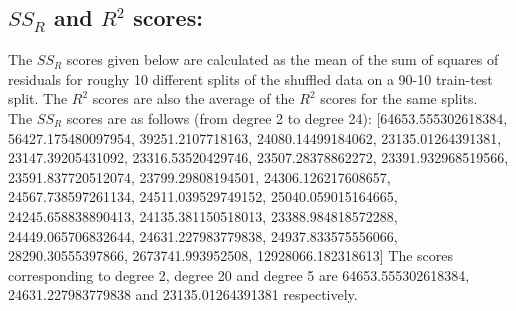 \subsection{$SS_R$ and $R^2$ scores: }
The $SS_R$ scores given below are calculated as the mean of the sum of squares of residuals for roughy 10 different splits of the shuffled data on a 90-10 train-test split. The $R^2$ scores are also the average of the $R^2$ scores for the same splits.\\
The $SS_R$ scores are as follows (from degree 2 to degree 24):
[64653.555302618384, 56427.175480097954, 39251.2107718163, 24080.14499184062, 23135.01264391381, 23147.39205431092, 23316.53520429746, 23507.28378862272, 23391.932968519566, 23591.837720512074, 23799.29808194501, 24306.126217608657, 24567.738597261134, 24511.039529749152, 25040.059015164665, 24245.658838890413, 24135.381150518013, 23388.984818572288, 24449.065706832644, 24631.227983779838, 24937.833575556066, 28290.30555397866, 2673741.993952508, 12928066.182318613]
The scores corresponding to degree 2, degree 20 and degree 5 are 64653.555302618384, 24631.227983779838 and 23135.01264391381 respectively.\\

\newpage 